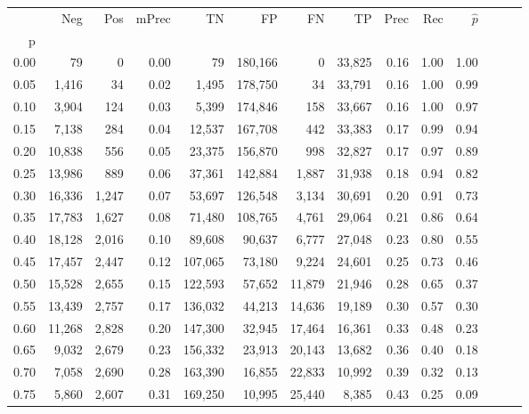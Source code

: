 \begin{tabular}{rrrrrrrrrrrrrr}
\toprule
{} &     Neg &    Pos & mPrec &       TN &       FP &      FN &      TP &  Prec &   Rec & $\hat{p}$ \\
p    &         &        &       &          &          &         &         &       &       &           \\
\midrule
0.00 &      79 &      0 &  0.00 &       79 &  180,166 &       0 &  33,825 &  0.16 &  1.00 &      1.00 \\
0.05 &   1,416 &     34 &  0.02 &    1,495 &  178,750 &      34 &  33,791 &  0.16 &  1.00 &      0.99 \\
0.10 &   3,904 &    124 &  0.03 &    5,399 &  174,846 &     158 &  33,667 &  0.16 &  1.00 &      0.97 \\
0.15 &   7,138 &    284 &  0.04 &   12,537 &  167,708 &     442 &  33,383 &  0.17 &  0.99 &      0.94 \\
0.20 &  10,838 &    556 &  0.05 &   23,375 &  156,870 &     998 &  32,827 &  0.17 &  0.97 &      0.89 \\
0.25 &  13,986 &    889 &  0.06 &   37,361 &  142,884 &   1,887 &  31,938 &  0.18 &  0.94 &      0.82 \\
0.30 &  16,336 &  1,247 &  0.07 &   53,697 &  126,548 &   3,134 &  30,691 &  0.20 &  0.91 &      0.73 \\
0.35 &  17,783 &  1,627 &  0.08 &   71,480 &  108,765 &   4,761 &  29,064 &  0.21 &  0.86 &      0.64 \\
0.40 &  18,128 &  2,016 &  0.10 &   89,608 &   90,637 &   6,777 &  27,048 &  0.23 &  0.80 &      0.55 \\
0.45 &  17,457 &  2,447 &  0.12 &  107,065 &   73,180 &   9,224 &  24,601 &  0.25 &  0.73 &      0.46 \\
0.50 &  15,528 &  2,655 &  0.15 &  122,593 &   57,652 &  11,879 &  21,946 &  0.28 &  0.65 &      0.37 \\
0.55 &  13,439 &  2,757 &  0.17 &  136,032 &   44,213 &  14,636 &  19,189 &  0.30 &  0.57 &      0.30 \\
0.60 &  11,268 &  2,828 &  0.20 &  147,300 &   32,945 &  17,464 &  16,361 &  0.33 &  0.48 &      0.23 \\
0.65 &   9,032 &  2,679 &  0.23 &  156,332 &   23,913 &  20,143 &  13,682 &  0.36 &  0.40 &      0.18 \\
0.70 &   7,058 &  2,690 &  0.28 &  163,390 &   16,855 &  22,833 &  10,992 &  0.39 &  0.32 &      0.13 \\
0.75 &   5,860 &  2,607 &  0.31 &  169,250 &   10,995 &  25,440 &   8,385 &  0.43 &  0.25 &      0.09 \\

\end{tabular}
